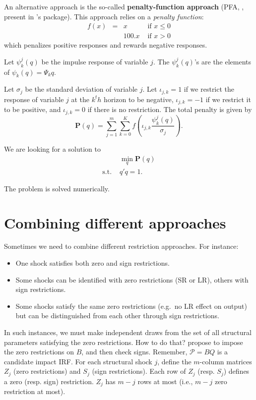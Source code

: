 \documentclass[
  12pt,
]{book}
\providecommand{\tightlist}{%
  \setlength{\itemsep}{0pt}\setlength{\parskip}{0pt}}
\theoremstyle{definition}
\theoremstyle{definition}
\theoremstyle{definition}
\theoremstyle{definition}
\theoremstyle{remark}
\begin{document}
An alternative approach is the so-called \textbf{penalty-function approach} (PFA, \citet{Uhlig_2005}, present in \citet{Danne_2015}'s package). This approach relies on a \emph{penalty function}:
\[
\begin{array}{llll}f(x)&=&x&\text{ if }x\le0\\
&&100.x&\text{ if }x>0\end{array}
\]
which penalizes positive responses and rewards negative responses.

Let \(\psi_k^j(q)\) be the impulse response of variable \(j\). The \(\psi_k^j(q)\)'s are the elements of \(\psi_k(q)=\Psi_kq\).

Let \(\sigma_j\) be the standard deviation of variable \(j\). Let \(\iota_{j,k}=1\) if we restrict the response of variable \(j\) at the \(k^th\) horizon to be negative, \(\iota_{j,k}=-1\) if we restrict it to be positive, and \(\iota_{j,k}=0\) if there is no restriction. The total penalty is given by \[
\mathbf{P}(q)=\sum_{j=1}^m\sum_{k=0}^Kf\left(\iota_{j,k}\frac{\psi_k^j(q)}{\sigma_j}\right).
\]

We are looking for a solution to
\[\begin{array}{ll}
&\min_q \mathbf{P}(q)\\
\text{s.t. }&q'q=1.\end{array}\]

The problem is solved numerically.

\hypertarget{combining-different-approaches}{%
\section{Combining different approaches}\label{combining-different-approaches}}

Sometimes we need to combine different restriction approaches. For instance:

\begin{itemize}
\tightlist
\item
  One shock satisfies both zero and sign restrictions.
\item
  Some shocks can be identified with zero restrictions (SR or LR), others with sign restrictions.
\item
  Some shocks satisfy the same zero restrictions (e.g.~no LR effect on output) but can be distinguished from each other through sign restrictions.
\end{itemize}

In such instances, we must make independent draws from the set of all structural parameters satisfying the zero restrictions. How to do that? \citet{Arias_et_al_2018} propose to impose the zero restrictions on \(B\), and then check signs. Remember, \(\mathcal{P}=BQ\) is a candidate impact IRF. For each structural shock \(j\), define the \(m\)-column matrices \(Z_j\) (zero restrictions) and \(S_j\) (sign restrictions). Each row of \(Z_j\) (resp. \(S_j\)) defines a zero (resp. sign) restriction. \(Z_j\) has \(m-j\) rows at most (i.e., \(m-j\) zero restriction at most).
\end{document}
